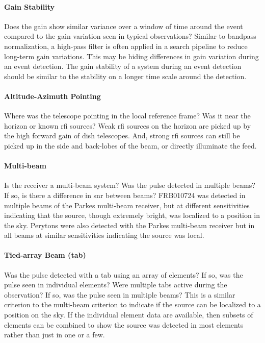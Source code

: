 \documentclass[a4paper,fleqn,usenatbib]{mnras}
\begin{document}
\paragraph{Gain Stability}

Does the gain show similar variance over a window of time around the event
compared to the gain variation seen in typical observations? Similar to bandpass
normalization, a high-pass filter is often applied in a search pipeline to
reduce long-term gain variations. This may be hiding differences in gain
variation during an event detection. The gain stability of a system during an
event detection should be similar to the stability on a longer time scale around
the detection.

\paragraph{Altitude-Azimuth Pointing}

Where was the telescope pointing in the local reference frame? Was it near the
horizon or known \gls{rfi} sources? Weak \gls{rfi} sources on the horizon are
picked up by the high forward gain of dish telescopes. And, strong \gls{rfi}
sources can still be picked up in the side and back-lobes of the beam, or
directly illuminate the feed.

\paragraph{Multi-beam}

Is the receiver a multi-beam system? Was the pulse detected in multiple beams?
If so, is there a difference in \gls{snr} between beams? FRB010724
\citep{2007Sci...318..777L} was detected in multiple beams of the Parkes
multi-beam receiver, but at different sensitivities indicating that the source,
though extremely bright, was localized to a position in the sky. Perytons were
also detected with the Parkes multi-beam receiver but in all beams at similar
sensitivities indicating the source was local.

\paragraph{Tied-array Beam (\gls{tab})}

Was the pulse detected with a \gls{tab} using an array of elements? If so, was
the pulse seen in individual elements? Were multiple \glspl{tab} active during
the observation? If so, was the pulse seen in multiple beams? This is a similar
criterion to the multi-beam criterion to indicate if the source can be localized
to a position on the sky. If the individual element data are available, then
subsets of elements can be combined to show the source was detected in most
elements rather than just in one or a few.
\end{document}
